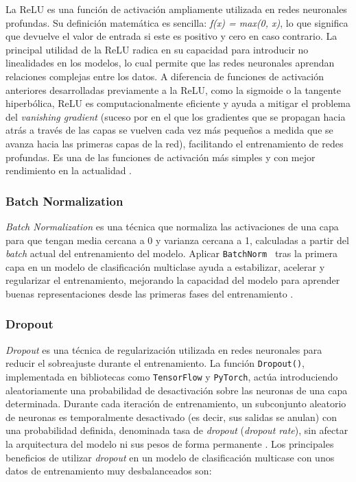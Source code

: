 La ReLU es una función de activación ampliamente utilizada en redes neuronales profundas. Su definición matemática es sencilla: \textit{f(x) = max(0, x)}, lo que significa que devuelve el valor de entrada si este es positivo y cero en caso contrario. La principal utilidad de la ReLU radica en su capacidad para introducir no linealidades en los modelos, lo cual permite que las redes neuronales aprendan relaciones complejas entre los datos. A diferencia de funciones de activación anteriores desarrolladas previamente a la ReLU, como la sigmoide o la tangente hiperbólica, ReLU es computacionalmente eficiente y ayuda a mitigar el problema del \textit{vanishing gradient} (suceso por en el que los gradientes que se propagan hacia atrás a través de las capas se vuelven cada vez más pequeños a medida que se avanza hacia las primeras capas de la red), facilitando el entrenamiento de redes profundas. Es una de las funciones de activación más simples y con mejor rendimiento en la actualidad \cite{nair2010relu}.

\subsubsection{Batch Normalization}
\textit{Batch Normalization} es una técnica que normaliza las activaciones de una capa para que tengan media cercana a 0 y varianza cercana a 1, calculadas a partir del \textit{batch} actual del entrenamiento del modelo. Aplicar \texttt{BatchNorm } tras la primera capa en un modelo de clasificación multiclase ayuda a estabilizar, acelerar y regularizar el entrenamiento, mejorando la capacidad del modelo para aprender buenas representaciones desde las primeras fases del entrenamiento \cite{ioffe2015batch}.

\subsubsection{Dropout}
\textit{Dropout} es una técnica de regularización utilizada en redes neuronales para reducir el sobreajuste durante el entrenamiento. La función \texttt{Dropout()}, implementada en bibliotecas como \texttt{TensorFlow} y \texttt{PyTorch}, actúa introduciendo aleatoriamente una probabilidad de desactivación sobre las neuronas de una capa determinada. Durante cada iteración de entrenamiento, un subconjunto aleatorio de neuronas es temporalmente desactivado (es decir, sus salidas se anulan) con una probabilidad definida, denominada tasa de \textit{dropout} (\textit{dropout rate}), sin afectar la arquitectura del modelo ni sus pesos de forma permanente \cite{srivastava2014dropout}. Los principales beneficios de utilizar \textit{dropout} en un modelo de clasificación multicase con unos datos de entrenamiento muy desbalanceados son:

